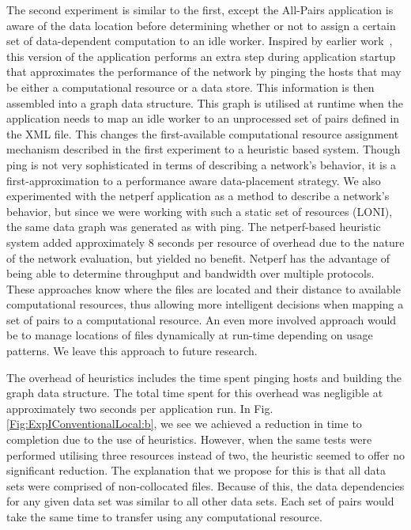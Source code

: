 \documentclass{rspublic}
\begin{document}
The second experiment is similar to the first, except the All-Pairs
application is aware of the data location before determining whether or
not to assign a certain set of data-dependent computation to an idle
worker. Inspired by earlier work~\citep{netperf}, this version of the
application performs an extra step during application startup that
approximates the performance of the network by pinging the hosts that
may be either a computational resource or a data store. This information
is then assembled into a graph data structure. This graph is utilised at
runtime when the application needs to map an idle worker to an
unprocessed set of pairs defined in the XML file. This changes the
first-available computational resource assignment mechanism described in
the first experiment to a heuristic based system. Though ping is not
very sophisticated in terms of describing a network's behavior, it is a
first-approximation to a performance aware data-placement strategy. We
also experimented with the netperf application \citep{netperf_web} as a
method to describe a network's behavior, but since we were working with
such a static set of resources (LONI), the same data graph was generated
as with ping. The netperf-based heuristic system added approximately 8
seconds per resource of overhead due to the nature of the network
evaluation, but yielded no benefit. Netperf has the advantage of being
able to determine throughput and bandwidth over multiple protocols.
These approaches know where the files are located and their distance to
available computational resources, thus allowing more intelligent
decisions when mapping a set of pairs to a computational resource. An
even more involved approach would be to manage locations of files
dynamically at run-time depending on usage patterns. We leave this
approach to future research. 

The overhead of heuristics includes the time spent pinging hosts and
building the graph data structure. The total time spent for this
overhead was negligible at approximately two seconds per application
run. In Fig. \ref{Fig:ExpIConventionalLocal:b}, we see we achieved a
reduction in time to completion due to the use of heuristics. However,
when the same tests were performed utilising three resources instead of
two, the heuristic seemed to offer no significant reduction. The
explanation that we propose for this is that all data sets were
comprised of non-collocated files. Because of this, the data
dependencies for any given data set was similar to all other data sets.
Each set of pairs would take the same time to transfer using any
computational resource.
\end{document}
